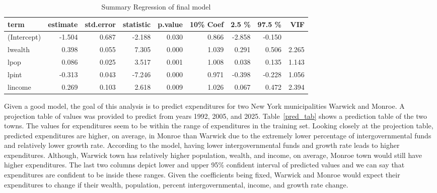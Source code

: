 \documentclass[11pt]{article}\usepackage[]{graphicx}\usepackage[]{color}
\begin{document}
\begin{center}
\begin{table}[ht]
\centering
\begin{tabular}{lrrrrrrrr}
  \hline
term & estimate & std.error & statistic & p.value & 10\% Coef & 2.5 \% & 97.5 \% & VIF \\ 
  \hline
(Intercept) & -1.504 & 0.687 & -2.188 & 0.030 & 0.866 & -2.858 & -0.150 &  \\ 
  lwealth & 0.398 & 0.055 & 7.305 & 0.000 & 1.039 & 0.291 & 0.506 & 2.265 \\ 
  lpop & 0.086 & 0.025 & 3.517 & 0.001 & 1.008 & 0.038 & 0.135 & 1.143 \\ 
  lpint & -0.313 & 0.043 & -7.246 & 0.000 & 0.971 & -0.398 & -0.228 & 1.056 \\ 
  lincome & 0.269 & 0.103 & 2.618 & 0.009 & 1.026 & 0.067 & 0.472 & 2.394 \\ 
   \hline
\end{tabular}
\caption{Summary Regression of final model} 
\label{reg_summary_final}
\end{table}

\end{center}

\noindent Given a good model, the goal of this analysis is to predict expenditures for two New York municipalities Warwick and Monroe. A projection table of values was provided to predict from years 1992, 2005, and 2025. Table~\ref{pred_tab} shows a prediction table of the two towns. The values for expenditures seem to be within the range of expenditures in the training set. Looking closely at the projection table, predicted expenditures are higher, on average, in Monroe than Warwick due to the extremely lower percentage of intergovernmental funds and relatively lower growth rate. According to the model, having lower intergovernmental funds and growth rate leads to higher expenditures. Although, Warwick town has relatively higher population, wealth, and income, on average, Monroe town would still have higher expenditures. The last two columns depict lower and upper 95\% confident interval of predicted values and we can say that expenditures are confident to be inside these ranges. Given the coefficients being fixed, Warwick and Monroe would expect their expenditures to change if their wealth, population, percent intergovernmental, income, and growth rate change.    
\end{document}
